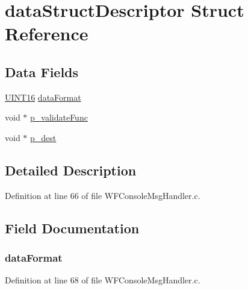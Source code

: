 \hypertarget{structdata_struct_descriptor}{}\section{data\+Struct\+Descriptor Struct Reference}
\label{structdata_struct_descriptor}
\subsection*{Data Fields}
\begin{DoxyCompactItemize}
\item 
\hyperlink{_generic_type_defs_8h_acfa284fa8026c4aace2728f7f15d6c13}{U\+I\+N\+T16} \hyperlink{structdata_struct_descriptor_af003fba93465d0c28764fc95c3af8368}{data\+Format}
\item 
void $\ast$ \hyperlink{structdata_struct_descriptor_a7cb32bcc982cd56b117ad607746264bc}{p\+\_\+validate\+Func}
\item 
void $\ast$ \hyperlink{structdata_struct_descriptor_aa1c5b83e492937d1d9d62a6f48082ca8}{p\+\_\+dest}
\end{DoxyCompactItemize}


\subsection{Detailed Description}


Definition at line 66 of file W\+F\+Console\+Msg\+Handler.\+c.



\subsection{Field Documentation}
\hypertarget{structdata_struct_descriptor_af003fba93465d0c28764fc95c3af8368}{}
\subsubsection[{data\+Format}]{ data\+Format}\label{structdata_struct_descriptor_af003fba93465d0c28764fc95c3af8368}


Definition at line 68 of file W\+F\+Console\+Msg\+Handler.\+c.

\hypertarget{structdata_struct_descriptor_aa1c5b83e492937d1d9d62a6f48082ca8}{}
